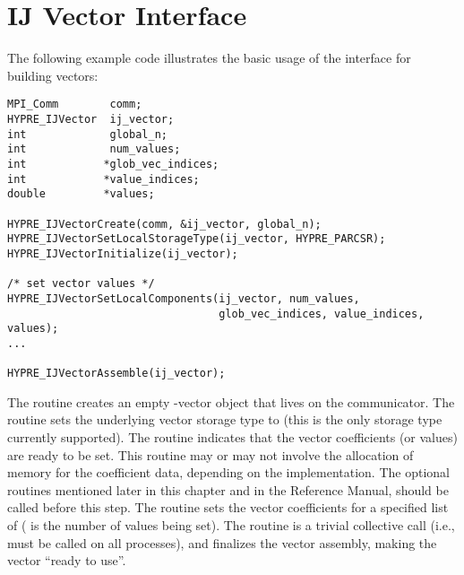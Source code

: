 %


\section{IJ Vector Interface}

The following example code illustrates the basic usage of the
 interface for building vectors:

\begin{display}
\begin{verbatim}
MPI_Comm        comm;
HYPRE_IJVector  ij_vector;
int             global_n;
int             num_values;
int            *glob_vec_indices;
int            *value_indices;
double         *values;

HYPRE_IJVectorCreate(comm, &ij_vector, global_n);
HYPRE_IJVectorSetLocalStorageType(ij_vector, HYPRE_PARCSR);
HYPRE_IJVectorInitialize(ij_vector);

/* set vector values */
HYPRE_IJVectorSetLocalComponents(ij_vector, num_values,
                                 glob_vec_indices, value_indices, values);
...

HYPRE_IJVectorAssemble(ij_vector);
\end{verbatim}
\end{display}

The  routine creates an empty -vector
object that lives on the  communicator.  The
 routine sets the underlying vector storage
type to  (this is the only storage type currently
supported).  The  routine indicates that the vector
coefficients (or values) are ready to be set.  This routine may or may
not involve the allocation of memory for the coefficient data,
depending on the implementation.  The optional  routines
mentioned later in this chapter and in the Reference Manual, should be
called before this step.  The  routine sets
the vector coefficients for a specified list of 
( is the number of values being set).  The 
routine is a trivial collective call (i.e., must be called on all processes),
and finalizes the vector assembly, making the vector ``ready to use''.

